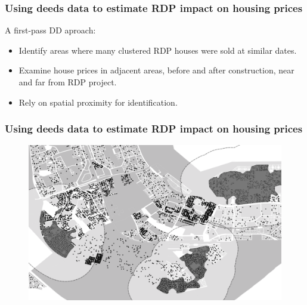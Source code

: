 \documentclass[aspectratio=149]{beamer}
\begin{document}
\begin{frame}
\frametitle{Using deeds data to estimate RDP impact on housing prices}

A first-pass DD aproach:
\begin{itemize}
  \item Identify areas where many clustered RDP houses were sold at similar dates.
  \item Examine house prices in adjacent areas, before and after construction, near and far from RDP project.
  \item Rely on spatial proximity for identification. 

\end{itemize}

\end{frame}


\begin{frame}
\frametitle{Using deeds data to estimate RDP impact on housing prices}

\begin{center}
\begin{figure}
\includegraphics[scale=0.30]{design2.png}
\vspace{-3mm}
\end{figure}
\end{center}



\end{frame}

\end{document}
